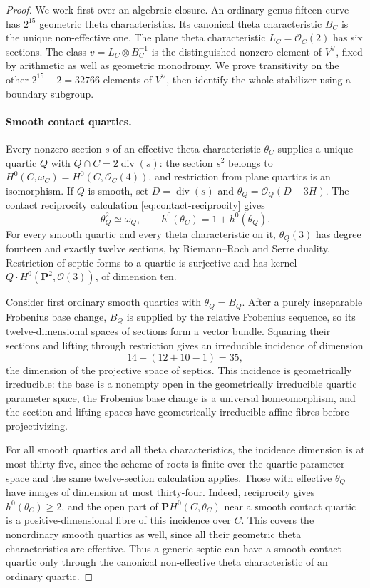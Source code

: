 \begin{proof}
We work first over an algebraic closure.  An ordinary genus-fifteen
curve has $2^{15}$ geometric theta characteristics.  Its canonical
theta characteristic $B_C$ is the unique non-effective one.  The
plane theta characteristic $L_C=\mathcal O_C(2)$ has six sections.
The class $v=L_C\otimes B_C^{-1}$ is the distinguished nonzero element
of $V^\vee$, fixed by arithmetic as well as geometric monodromy.
We prove transitivity on the other $2^{15}-2=32766$ elements of
$V^\vee$, then identify the whole stabilizer using a boundary subgroup.

\paragraph{Smooth contact quartics.}
Every nonzero section $s$ of an effective theta characteristic
$\theta_C$ supplies a unique quartic $Q$ with
$Q\cap C=2\operatorname{div}(s)$: the section $s^2$ belongs to
$H^0(C,\omega_C)=H^0(C,\mathcal O_C(4))$, and restriction from plane
quartics is an isomorphism.  If $Q$ is smooth, set
$D=\operatorname{div}(s)$ and
$\theta_Q=\mathcal O_Q(D-3H)$.  The contact reciprocity calculation
\eqref{eq:contact-reciprocity} gives
\[
 \theta_Q^2\simeq\omega_Q,\qquad
 h^0(\theta_C)=1+h^0(\theta_Q).
\]
For every smooth quartic and every theta characteristic on it,
$\theta_Q(3)$ has degree fourteen and exactly twelve sections, by
Riemann--Roch and Serre duality.  Restriction of septic forms to a
quartic is surjective and has kernel
$Q\cdot H^0(\mathbf P^2,\mathcal O(3))$, of dimension ten.

Consider first ordinary smooth quartics with $\theta_Q=B_Q$.
After a purely inseparable Frobenius base change, $B_Q$ is supplied
by the relative Frobenius sequence, so its twelve-dimensional spaces
of sections form a vector bundle.  Squaring their sections and lifting
through restriction gives an irreducible incidence of dimension
\[
 14+(12+10-1)=35,
\]
the dimension of the projective space of septics.  This incidence is
geometrically irreducible: the base is a nonempty open in the
geometrically irreducible quartic parameter space, the Frobenius
base change is a universal homeomorphism, and the section and lifting
spaces have geometrically irreducible affine fibres before
projectivizing.

For all smooth quartics and all theta characteristics, the incidence
dimension is at most thirty-five, since the scheme of roots is
finite over the quartic parameter space and the same twelve-section
calculation applies.  Those with effective $\theta_Q$ have images
of dimension at most thirty-four.  Indeed, reciprocity gives
$h^0(\theta_C)\ge2$, and the open part of
$\mathbf P H^0(C,\theta_C)$ near a smooth contact quartic is a
positive-dimensional fibre of this incidence over $C$.  This covers
the nonordinary smooth quartics as well, since all their geometric
theta characteristics are effective.  Thus a generic septic can
have a smooth contact quartic only through the canonical
non-effective theta characteristic of an ordinary quartic.


\end{proof}
